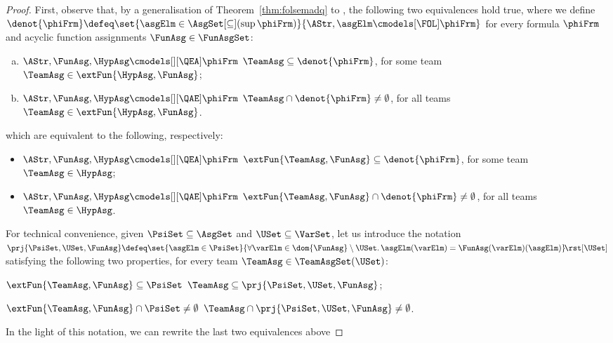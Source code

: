 \documentclass[authoryear]{elsarticle}
\newcommand{\EmpTeamAsg}{\emptyset}
\begin{document}
\thmqntint*
%
\begin{proof}
  First, observe that, by a generalisation of Theorem~\ref{thm:folsemadq} to
  \Meta, the following two equivalences hold true, where we define
  $\denot{\phiFrm} \defeq \set{ \asgElm \in \AsgSet[\subseteq](\sup{\phiFrm}) }{
    \AStr, \asgElm \cmodels[\FOL] \phiFrm }$ for every \FOL formula $\phiFrm$
  and acyclic function assignments $\FunAsg \in \FunAsgSet$:
  \begin{enumerate}[a)]
    \item\label{thm:qntint(ea)}
      $\AStr, \FunAsg, \HypAsg \cmodels[][\QEA] \phiFrm$ \iff $\TeamAsg
      \subseteq \denot{\phiFrm}$, for some team $\TeamAsg \in \extFun{\HypAsg,
      \FunAsg}$;
    \item\label{thm:qntint(ae)}
      $\AStr, \FunAsg, \HypAsg \cmodels[][\QAE] \phiFrm$ \iff $\TeamAsg \cap
      \denot{\phiFrm} \neq \EmpTeamAsg$, for all teams $\TeamAsg \in
      \extFun{\HypAsg, \FunAsg}$.
  \end{enumerate}
%
  which are equivalent to the following, respectively:
  \begin{itemize}[$\bullet$]
  \item
    $\AStr, \FunAsg, \HypAsg \cmodels[][\QEA] \phiFrm$ \iff $\extFun{\TeamAsg,
      \FunAsg} \subseteq \denot{\phiFrm}$, for some team $\TeamAsg \in \HypAsg$;
  \item
    $\AStr, \FunAsg, \HypAsg \cmodels[][\QAE] \phiFrm$ \iff $\extFun{\TeamAsg,
      \FunAsg} \cap \denot{\phiFrm} \neq \EmpTeamAsg$, for all teams $\TeamAsg
    \in \HypAsg$.
  \end{itemize}
%
  For technical convenience, given $\PsiSet \subseteq \AsgSet$ and $\USet
  \subseteq \VarSet$, let us introduce the notation $\prj{\PsiSet, \USet,
    \FunAsg} \defeq \set{ \asgElm \in \PsiSet }{ \forall \varElm \in
    \dom{\FunAsg} \setminus \USet \ldotp \asgElm(\varElm) =
    \FunAsg(\varElm)(\asgElm) } \!\rst[\USet]$ satisfying the following two
  properties, for every team $\TeamAsg \in \TeamAsgSet(\USet)$:
  \begin{inparaenum}[(i)]
    \item
      $\extFun{\TeamAsg, \FunAsg} \subseteq \PsiSet$ \iff $\TeamAsg \subseteq
      \prj{\PsiSet, \USet, \FunAsg}$;
    \item
      $\extFun{\TeamAsg, \FunAsg} \cap \PsiSet \neq \EmpTeamAsg$ \iff $\TeamAsg
      \cap \prj{\PsiSet, \USet, \FunAsg} \neq \EmpTeamAsg$.
  \end{inparaenum}
%
  In the light of this notation, we can rewrite the last two equivalences above

\end{proof}
\end{document}
